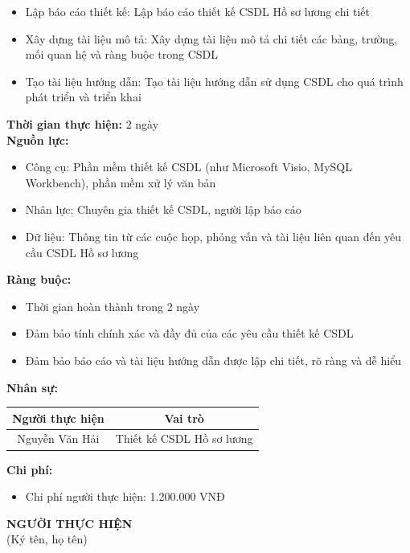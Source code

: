 {\begin{minipage}{\textwidth}
\begin{itemize}
        \item Lập báo cáo thiết kế: Lập báo cáo thiết kế CSDL Hồ sơ lương chi tiết
        \item Xây dựng tài liệu mô tả: Xây dựng tài liệu mô tả chi tiết các bảng, trường, mối quan hệ và ràng buộc trong CSDL
        \item Tạo tài liệu hướng dẫn: Tạo tài liệu hướng dẫn sử dụng CSDL cho quá trình phát triển và triển khai
    \end{itemize}
    \vspace{0.5cm}
    \noindent \textbf{Thời gian thực hiện:} 2 ngày \\
    \noindent \textbf{Nguồn lực:}
    \begin{itemize}
        \item Công cụ: Phần mềm thiết kế CSDL (như Microsoft Visio, MySQL Workbench), phần mềm xử lý văn bản
        \item Nhân lực: Chuyên gia thiết kế CSDL, người lập báo cáo
        \item Dữ liệu: Thông tin từ các cuộc họp, phỏng vấn và tài liệu liên quan đến yêu cầu CSDL Hồ sơ lương
    \end{itemize}
    \vspace{0.5cm}
    \noindent \textbf{Ràng buộc:}
    \begin{itemize}
        \item Thời gian hoàn thành trong 2 ngày
        \item Đảm bảo tính chính xác và đầy đủ của các yêu cầu thiết kế CSDL
        \item Đảm bảo báo cáo và tài liệu hướng dẫn được lập chi tiết, rõ ràng và dễ hiểu
    \end{itemize}
    \vspace{0.5cm}
    \noindent \textbf{Nhân sự:}
    \begin{longtable}{|c|c|}
    \hline
    \textbf{Người thực hiện} & \textbf{Vai trò} \\
    \hline
    Nguyễn Văn Hải & Thiết kế CSDL Hồ sơ lương \\
    \hline
    \end{longtable}
    \vspace{0.5cm}
    \noindent \textbf{Chi phí:}
    \begin{itemize}
        \item Chi phí người thực hiện: 1.200.000 VNĐ
    \end{itemize}
    \vspace{1cm}
    \begin{flushleft}
        \hspace{8cm} \textbf{NGƯỜI THỰC HIỆN} \\
        \hspace{8.8cm} (Ký tên, họ tên) \\
        \vspace{1cm}
    \end{flushleft}
    \end{minipage}
}
%
